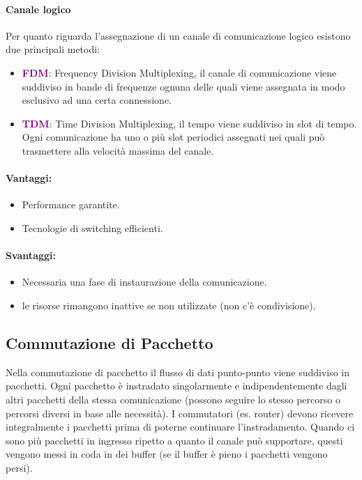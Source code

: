     \paragraph*{Canale logico} Per quanto riguarda l'assegnazione di un canale di comunicazione logico esistono due principali metodi:
        \begin{itemize}
            \item \textbf{\textcolor{purple}{FDM}}: Frequency Division Multiplexing, il canale di comunicazione viene suddiviso in bande di frequenze ognuna delle quali viene assegnata in modo esclusivo ad una certa connessione.
            \item \textbf{\textcolor{purple}{TDM}}: Time Division Multiplexing, il tempo viene suddiviso in slot di tempo. Ogni comunicazione ha uno o più slot periodici assegnati nei quali può trasmettere alla velocità massima del canale.
        \end{itemize}

    \paragraph*{Vantaggi:}
    \begin{itemize}
        \item Performance garantite.
        \item Tecnologie di switching efficienti.
    \end{itemize}

    \paragraph*{Svantaggi:}
    \begin{itemize}
        \item Necessaria una fase di instaurazione della comunicazione.
        \item le risorse rimangono inattive se non utilizzate (non c’è condivisione).
    \end{itemize}


    \subsection{Commutazione di Pacchetto}
    Nella commutazione di pacchetto il flusso di dati punto-punto viene suddiviso in pacchetti. Ogni pacchetto è instradato singolarmente e indipendentemente dagli altri pacchetti della stessa comunicazione (possono seguire lo stesso percorso o percorsi diversi in base alle necessità).
    \newline
    I commutatori (es. router) devono ricevere integralmente i pacchetti prima di poterne continuare l'instradamento. Quando ci sono più pacchetti in ingresso ripetto a quanto il canale può supportare, questi vengono messi in coda in dei buffer (se il buffer è pieno i pacchetti vengono persi).
    
